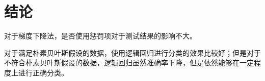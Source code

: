 \section{结论}

对于梯度下降法，是否使用惩罚项对于测试结果的影响不大。

对于满足朴素贝叶斯假设的数据，使用逻辑回归进行分类的效果比较好；但是对于不符合朴素贝叶斯假设的数据，逻辑回归虽然准确率下降，但是依然能够在一定程度上进行正确分类\cite{no-native}。
